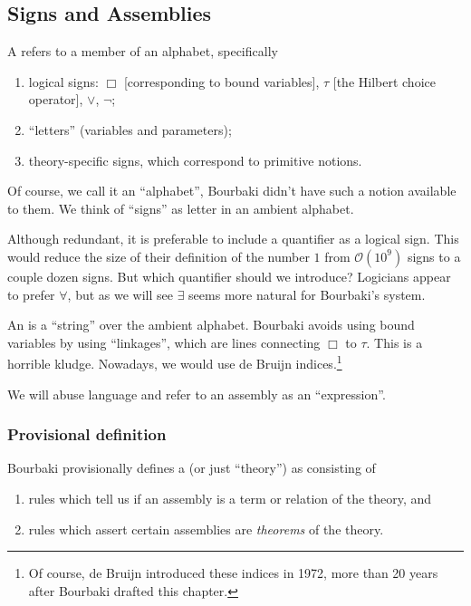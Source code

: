 \subsection{Signs and Assemblies}

\begin{definition}
A  refers to a member of an alphabet, specifically
\begin{enumerate}
\item logical signs: $\Box$ [corresponding to bound variables], $\tau$ [the Hilbert choice operator], $\lor$, $\neg$;
\item ``letters'' (variables and parameters);
\item theory-specific signs, which correspond to primitive notions.
\end{enumerate}
Of course, we call it an ``alphabet'', Bourbaki didn't have such a
notion available to them. We think of ``signs'' as letter in an ambient alphabet.
\end{definition}

\begin{puzzle}
Although redundant, it is preferable to include a quantifier as a
logical sign. This would reduce the size of their definition of the
number $1$ from $\mathcal{O}(10^{9})$
signs to a couple dozen signs. But which quantifier should we introduce?
Logicians appear to prefer $\forall$, but as we will see $\exists$ seems
more natural for Bourbaki's system.
\end{puzzle}

\begin{definition}
An  is a ``string'' over the ambient alphabet. Bourbaki
avoids using bound variables by using ``linkages'', which are lines
connecting $\Box$ to $\tau$. This is a horrible kludge. Nowadays, we
would use de Bruijn indices.\footnote{Of course, de Bruijn introduced
these indices in 1972, more than 20 years after Bourbaki drafted this chapter.}

We will abuse language and refer to an assembly as an ``expression''.
\end{definition}

\subsubsection{Provisional definition}
Bourbaki provisionally defines a  (or just
``theory'') as consisting of
\begin{enumerate}
\item rules which tell us if an assembly is a term or relation of the
  theory, and
\item rules which assert certain assemblies are \emph{theorems} of the theory.
\end{enumerate}


